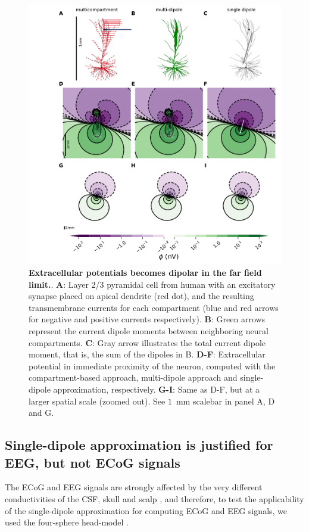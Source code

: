 \documentclass[preprint,10pt,authoryear]{elsarticle}
\begin{document}
\begin{figure}[H]
	\centering
	\includegraphics[width=1.0\textwidth]{fig_dipole_field}
	\caption{\textbf{Extracellular potentials becomes dipolar in the far field limit.}. 
	\textbf{A}: Layer 2/3 pyramidal cell from human \citep{EYAL2016} with an excitatory synapse placed on apical dendrite (red dot), and the resulting transmembrane currents for each compartment (blue and red arrows for negative and positive currents respectively).
	\textbf{B}: Green arrows represent the current dipole moments between neighboring neural compartments.
	\textbf{C}: Gray arrow illustrates the total current dipole moment, that is, the sum of the dipoles in B.
	\textbf{D-F}: Extracellular potential in immediate proximity of the neuron, computed with the compartment-based approach, multi-dipole approach and single-dipole approximation, respectively.
	\textbf{G-I}: Same as D-F, but at a larger spatial scale (zoomed out). See $1$~mm scalebar in panel A, D and G.
	}
	\label{fig:dipole_field}
\end{figure}


\subsection{Single-dipole approximation is justified for EEG, but not ECoG signals}\label{subsec:cb_db_comp_4s}
The ECoG and EEG signals are strongly affected by the very different conductivities of the CSF, skull and scalp \citep{NUNEZ2006}, and therefore, to test the applicability of the single-dipole approximation for computing ECoG and EEG signals, we used the four-sphere head-model \citep{NAESS2017, HAGEN2018, HAGEN2019}. 
\end{document}
